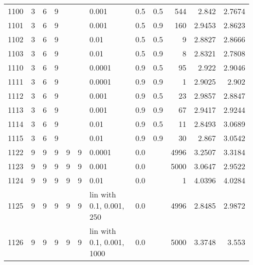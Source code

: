 \begin{longtable}{lrrrrrlrrrrr}
1100 &       3 & 6 & 9 &   &   &                       0.001 &  0.5 &    0.5 &     544 &                  2.842 &                 2.7674 \\
1101 &       3 & 6 & 9 &   &   &                       0.001 &  0.5 &    0.9 &     160 &                 2.9453 &                 2.8623 \\
1102 &       3 & 6 & 9 &   &   &                        0.01 &  0.5 &    0.5 &       9 &                 2.8827 &                 2.8666 \\
1103 &       3 & 6 & 9 &   &   &                        0.01 &  0.5 &    0.9 &       8 &                 2.8321 &                 2.7808 \\
1110 &       3 & 6 & 9 &   &   &                      0.0001 &  0.9 &    0.5 &      95 &                  2.922 &                 2.9046 \\
1111 &       3 & 6 & 9 &   &   &                      0.0001 &  0.9 &    0.9 &       1 &                 2.9025 &                  2.902 \\
1112 &       3 & 6 & 9 &   &   &                       0.001 &  0.9 &    0.5 &      23 &                 2.9857 &                 2.8847 \\
1113 &       3 & 6 & 9 &   &   &                       0.001 &  0.9 &    0.9 &      67 &                 2.9417 &                 2.9244 \\
1114 &       3 & 6 & 9 &   &   &                        0.01 &  0.9 &    0.5 &      11 &                 2.8493 &                 3.0689 \\
1115 &       3 & 6 & 9 &   &   &                        0.01 &  0.9 &    0.9 &      30 &                  2.867 &                 3.0542 \\
1122 &       9 & 9 & 9 & 9 & 9 &                      0.0001 &  0.0 &        &    4996 &                 3.2507 &                 3.3184 \\
1123 &       9 & 9 & 9 & 9 & 9 &                       0.001 &  0.0 &        &    5000 &                 3.0647 &                 2.9522 \\
1124 &       9 & 9 & 9 & 9 & 9 &                        0.01 &  0.0 &        &       1 &                 4.0396 &                 4.0284 \\
1125 &       9 & 9 & 9 & 9 & 9 &    lin with 0.1, 0.001, 250 &  0.0 &        &    4996 &                 2.8485 &                 2.9872 \\
1126 &       9 & 9 & 9 & 9 & 9 &   lin with 0.1, 0.001, 1000 &  0.0 &        &    5000 &                 3.3748 &                  3.553 \\

\end{longtable}
